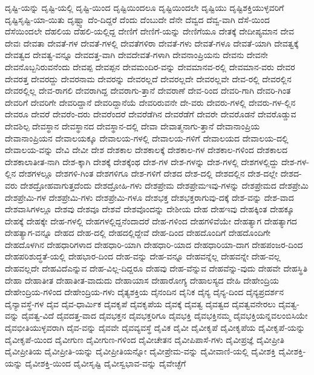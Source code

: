 {ದೃಷ್ಟಿ-ಯನ್ನು
ದೃಷ್ಟಿ-ಯಲ್ಲಿ
ದೃಷ್ಟಿ-ಯಿಂದ
ದೃಷ್ಟಿಯಿಂದಲೂ
ದೃಷ್ಟಿಯಿಂದಲೇ
ದೃಷ್ಟಿಯು
ದೃಷ್ಟಿಶಕ್ತಿಯುಳ್ಳವರಿಗೆ
ದೃಷ್ಟಿಸೃಷ್ಟಿ-ಯಾ-ಯಿತು
ದೃಷ್ಟ್ವಾ
ದೆಂ-ದಿದ್ದರೆ
ದೆಂದು
ದೆಂಬುದೇ
ದೆನೇ
ದೆವ್ವದ
ದೆವ್ವ-ವಾಗಿ
ದೆಸೆ-ಯಿಂದ
ದೆಸೆಯಿಂದಲೇ
ದೆಹಲಿಯ
ದೆಹಲಿ-ಯಲ್ಲಿದ್ದ
ದೇಣಿಗೆ
ದೇಣಿಗೆ-ಯನ್ನು
ದೇಣಿಗೆಯೂ
ದೇತಕ್ಕೆ
ದೇದೀಪ್ಯಮಾನ
ದೇವ
ದೇವಃ
ದೇವತಾ
ದೇವತೆ-ಗಳ
ದೇವತೆ-ಗಳಲ್ಲಿ
ದೇವತೆಗಳಿರಾ
ದೇವತೆ-ಗಳು
ದೇವತೆ-ಗಳೂ
ದೇವತೆ-ಯಾಗಿ
ದೇವತ್ವಕ್ಕೆ
ದೇವತ್ವದ
ದೇವತ್ವ-ವನ್ನೂ
ದೇವದತ್ತ-ವಾಗಿ
ದೇವದೇವತೆ-ಗಳಾಗಿ
ದೇವನಾಂಪ್ರಿಯನು
ದೇವನು
ದೇವನೇ
ದೇವನೊಬ್ಬನಿರುವನೆಂದು
ದೇವಪ್ಪ
ದೇವಪ್ಪನ
ದೇವಮಂದಿರ-ವನ್ನು
ದೇವಮಾನವ-ರಲ್ಲಿ
ದೇವಮಾನ-ವರು
ದೇವರ
ದೇವರತ್ತ
ದೇವರದ್ದು
ದೇವರನಾಮ
ದೇವರನ್ನು
ದೇವರಲ್ಲದೆ
ದೇವರಲ್ಲದೇ
ದೇವರಲ್ಲವೇ
ದೇವ-ರಲ್ಲಿ
ದೇವರಲ್ಲಿನ
ದೇವರಲ್ಲಿಲ್ಲ
ದೇವ-ರಾಗಲಿ
ದೇವರಾಗಿದ್ದ
ದೇವರಾಗು-ತ್ತಾನೆ
ದೇವರಾಣೆ
ದೇವ-ರಿಂದ
ದೇವರಿ-ಗಾಗಿ
ದೇವರಿ-ಗಿಂತ
ದೇವರಿಗೆ
ದೇವರಿಗೇ
ದೇವರಿದ್ದಾನೆ
ದೇವರಿದ್ದಾನೆಯೆ
ದೇವರಿರುವನೇ
ದೇ-ವರು
ದೇವರು-ಗಳಲ್ಲಿ
ದೇವರು-ಗಳ-ಲ್ಲಿನ
ದೇವರೂ
ದೇವರೆ
ದೇವರೆಂ-ದರು
ದೇವರೆಂದರೆ
ದೇವರೆಡೆಗಿನ
ದೇವರೆಡೆಗೆ
ದೇವರೇ
ದೇವರೊಡನೆ
ದೇವರೊಡ್ಡುವ
ದೇವಶಿಲ್ಪ
ದೇವಸ್ಥಾನ
ದೇವಸ್ಥಾನದ
ದೇವಸ್ಥಾನ-ದಲ್ಲಿ
ದೇವಾ
ದೇವಾತ್ಮನಾಗು-ತ್ತಾನೆ
ದೇವಾನಾಂಪ್ರಿಯ
ದೇವಾನಾಂಪ್ರಿಯನ
ದೇವಾಲಯಕ್ಕೂ
ದೇವಾಲಯ-ಗಳಲ್ಲಿ
ದೇವಾಲಯ-ಗಳಿಗೆ
ದೇವಾಲಯದ
ದೇವಾಲಯ-ದಲ್ಲಿ
ದೇವಾಲಯ-ವನ್ನು
ದೇವಿ
ದೇವೀ
ದೇಶ
ದೇಶಕಾಲ
ದೇಶಕಾಲಕ್ಕೆ
ದೇಶಕಾಲ-ಗಳ
ದೇಶಕಾಲ-ಗಳಿಂದ
ದೇಶಕಾಲದ
ದೇಶಕಾಲಾತೀತ-ನಾಗಿ
ದೇಶ-ಕ್ಕಾಗಿ
ದೇಶಕ್ಕೆ
ದೇಶಕ್ಕೆಂಥ
ದೇಶ-ಗಳ
ದೇಶ-ಗಳನ್ನು
ದೇಶ-ಗಳಲ್ಲಿ
ದೇಶಗಳಲ್ಲಿದ್ದು
ದೇಶ-ಗಳ-ಲ್ಲಿನ
ದೇಶಗಳಲ್ಲೂ
ದೇಶಗಳಿ-ಗಿಂತ
ದೇಶಗಳಿಗೂ
ದೇಶ-ಗಳಿಗೆ
ದೇಶದ
ದೇಶ-ದಲ್ಲಿ
ದೇಶದಲ್ಲಿನ
ದೇಶ-ದಲ್ಲೇ
ದೇಶದ-ವರು
ದೇಶದ್ರೋಹವಾಗುತ್ತದೆಂದು
ದೇಶದ್ರೋಹಿ-ಗಳು
ದೇಶಪ್ರೇಮ
ದೇಶಪ್ರೇಮಇವು-ಗಳನ್ನು
ದೇಶಪ್ರೇಮದ
ದೇಶಪ್ರೇಮಿ
ದೇಶಪ್ರೇಮಿ-ಗಳ
ದೇಶಪ್ರೇಮಿ-ಗಳು
ದೇಶಪ್ರೇಮಿ-ಗಳೂ
ದೇಶಭಕ್ತ
ದೇಶಭಕ್ತರಾಗುವು-ದಕ್ಕೆ
ದೇಶ-ವನ್ನು
ದೇಶ-ವಾದ
ದೇಶವಾಸಿಗಳಲ್ಲೂ
ದೇಶವು
ದೇಶವೂ
ದೇಶವೆ
ದೇಶವೊಂದನ್ನು
ದೇಶೀಯ
ದೇಹ
ದೇಹಇವು
ದೇಹಕ್ಕಿಂತ
ದೇಹಕ್ಕೂ
ದೇಹಕ್ಕೆ
ದೇಹಕ್ಕೇ
ದೇಹ-ಗಳಲ್ಲಿ
ದೇಹಗಳಲ್ಲಿದ್ದನೆಂದಾದರೆ
ದೇಹ-ಗಳಿಂದ
ದೇಹಗಳಿವೆಯೇ
ದೇಹತ್ಯಾಗ
ದೇಹತ್ಯಾಗದ
ದೇಹತ್ಯಾಗ-ವನ್ನೂ
ದೇಹದ
ದೇಹ-ದಲ್ಲಿ
ದೇಹದಲ್ಲಿದ್ದೇವೆ
ದೇಹ-ದಿಂದ
ದೇಹದೊಂದಿಗೆ
ದೇಹದೊಂದಿಗೇ
ದೇಹದೊಳಗಿನ
ದೇಹಧಾರಿಗಳಾದ
ದೇಹಧಾರಿ-ಯಾಗಿ
ದೇಹಧಾರಿ-ಯಾದ
ದೇಹಧಾರಿಯಾ-ದಾಗ
ದೇಹಪಂಜರ-ದಿಂದ
ದೇಹಪರಿಶುದ್ಧತೆ-ಯಲ್ಲಿ
ದೇಹಭಾರ-ದಿಂದ
ದೇಹ-ವನ್ನು
ದೇಹ-ವನ್ನೂ
ದೇಹವನ್ನೆಲ್ಲ
ದೇಹವನ್ನೇ
ದೇಹ-ವಲ್ಲ
ದೇಹವಲ್ಲದೇ
ದೇಹವಿದೆಎನ್ನುವ
ದೇಹ-ವಿಲ್ಲ-ದಿದ್ದರೂ
ದೇಹವು
ದೇಹ-ವೆನ್ನುವ
ದೇಹವೆನ್ನು-ವುದು
ದೇಹವೇ
ದೇಹಸ್ಥಿತಿ
ದೇಹಾ
ದೇಹಾತೀತ
ದೇಹಾತೀತ-ವಾದುದು
ದೇಹಾಯಾಸ
ದೇಹಾರೋಗ್ಯ
ದೇಹಾಲಸ್ಯದ
ದೇಹಿ
ದೇಹೇಂದ್ರಿಯ
ದೇಹೇಂದ್ರಿಯ-ಗಳಿಂದ
ದೇಹೇಂದ್ರಿಯ-ಗಳು
ದೈತ್ಯಶಕ್ತಿಯ
ದೈನಂದಿನ
ದೈನಿಕ
ದೈನ್ಯ
ದೈನ್ಯ-ದಿಂದ
ದೈನ್ಯಪ್ರದರ್ಶನ
ದೈನ್ಯಾವಸ್ಥೆ-ಗಳ
ದೈವ
ದೈವ-ಧಾರ್ಮಿಕ
ದೈವಕೃಪೆ
ದೈವಕೃಪೆಯ
ದೈವಕ್ಕೆ
ದೈವತ್ವ
ದೈವತ್ವದ
ದೈವತ್ವವನೇರಲು
ದೈವತ್ವ-ವನ್ನು
ದೈವತ್ವ-ವಿದೆ
ದೈವದತ್ತ-ವಾದ
ದೈವಭಕ್ತನ
ದೈವಭಕ್ತರಿಗೂ
ದೈವಭಕ್ತಿ
ದೈವಭಕ್ತಿನಮ್ಮ
ದೈವಭಕ್ತಿಯನ್ನವಲಂಬಿಸಿಯೇ
ದೈವಭೀತಿಯುಳ್ಳವರಾಗಿ
ದೈವ-ವನ್ನು
ದೈವವೇ
ದೈವವ್ಯವಸ್ಥೆ
ದೈವಿಕ
ದೈವೀ
ದೈವೀಕೃಪೆ
ದೈವೀಕೃಪೆಯ
ದೈವೀಕೃಪೆ-ಯನ್ನು
ದೈವೀಕೃಪೆ-ಯಿಂದ
ದೈವೀಗುಣ
ದೈವೀಗುಣ-ಗಳಿಂದ
ದೈವೀಚೇತನ
ದೈವೀಪಿಪಾಸೆ-ಗಳು
ದೈವೀಪ್ರಜ್ಞೆ
ದೈವೀಪ್ರೀತಿ
ದೈವೀಪ್ರೀತಿಯ
ದೈವೀಪ್ರೀತಿ-ಯನ್ನು
ದೈವೀಪ್ರೀತಿಯನ್ನೋ
ದೈವೀಪ್ರೇಮ-ವನ್ನು
ದೈವೀವಾಣಿ-ಯಲ್ಲಿ
ದೈವೀಶಕ್ತಿ
ದೈವೀಶಕ್ತಿ-ಯನ್ನು
ದೈವೀಶಕ್ತಿ-ಯಿಂದ
ದೈವೀಸೃಷ್ಟಿ
ದೈವೀಸ್ವಭಾವ-ವನ್ನು
ದೈವೇಚ್ಛೆಗೆ
}
